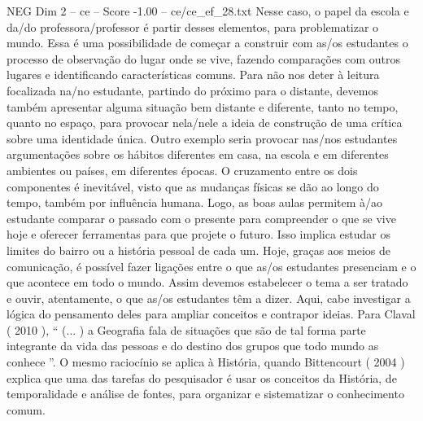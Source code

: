 \begin{textsample}{NEG Dim 2 – ce – Score -1.00 – ce/ce\_ef\_28.txt}
Nesse caso, o papel da escola e da/do professora/professor é partir desses elementos, para problematizar o mundo.
Essa é uma possibilidade de começar a construir com as/os estudantes o processo de observação do lugar onde se vive, fazendo comparações com outros lugares e identificando características comuns.
Para não nos deter à leitura focalizada na/no estudante, partindo do próximo para o distante, devemos também apresentar alguma situação bem distante e diferente, tanto no tempo, quanto no espaço, para provocar nela/nele a ideia de construção de uma crítica sobre uma identidade única.
Outro exemplo seria provocar nas/nos estudantes argumentações sobre os hábitos diferentes em casa, na escola e em diferentes ambientes ou países, em diferentes épocas.
O cruzamento entre os dois componentes é inevitável, visto que as mudanças físicas se dão ao longo do tempo, também por influência humana.
Logo, as boas aulas permitem à/ao estudante comparar o passado com o presente para compreender o que se vive hoje e oferecer ferramentas para que projete o futuro.
Isso implica estudar os limites do bairro ou a história pessoal de cada um.
Hoje, graças aos meios de comunicação, é possível fazer ligações entre o que as/os estudantes presenciam e o que acontece em todo o mundo.
Assim devemos estabelecer o tema a ser tratado e ouvir, atentamente, o que as/os estudantes têm a dizer.
Aqui, cabe investigar a lógica do pensamento deles para ampliar conceitos e contrapor ideias.
Para Claval ( 2010 ), “ (... ) a Geografia fala de situações que são de tal forma parte integrante da vida das pessoas e do destino dos grupos que todo mundo as conhece ”.
O mesmo raciocínio se aplica à História, quando Bittencourt ( 2004 ) explica que uma das tarefas do pesquisador é usar os conceitos da História, de temporalidade e análise de fontes, para organizar e sistematizar o conhecimento comum.

\end{textsample}
